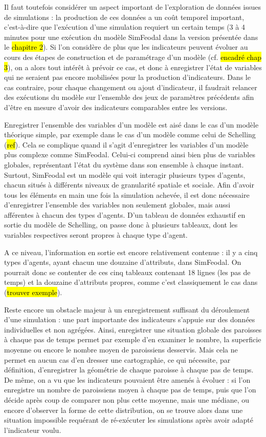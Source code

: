 	Il faut toutefois considérer un aspect important de l'exploration de données issues de simulations : la production de ces données a un coût temporel important, c'est-à-dire que l'exécution d'une simulation requiert un certain temps (3 à 4 minutes pour une exécution du modèle SimFeodal dans la version présentée dans le \hl{chapitre 2}).
	Si l'on considère de plus que les indicateurs peuvent évoluer au cours des étapes de construction et de paramétrage d'un modèle (cf. \hl{encadré chap 3}), on a alors tout intérêt à prévoir ce cas, et donc à enregistrer l'état de variables qui ne seraient pas encore mobilisées pour la production d'indicateurs.
	Dans le cas contraire, pour chaque changement ou ajout d'indicateur, il faudrait relancer des exécutions du modèle sur l'ensemble des jeux de paramètres précédents afin d'être en mesure d'avoir des indicateurs comparables entre les versions.

	Enregistrer l'ensemble des variables d'un modèle est aisé dans le cas d'un modèle théorique simple, par exemple dans le cas d'un modèle comme celui de Schelling (\hl{ref}). Cela se complique quand il s'agit d'enregistrer les variables d'un modèle plus complexe comme SimFeodal.
	Celui-ci comprend ainsi bien plus de variables globales, représentant l'état du système dans son ensemble à chaque instant.
	Surtout, SimFeodal est un modèle qui voit interagir plusieurs types d'agents, chacun situés à différents niveaux de granularité spatiale et sociale.
	Afin d'avoir tous les éléments en main une fois la simulation achevée, il est donc nécessaire d'enregistrer l'ensemble des variables non seulement globales, mais aussi afférentes à chacun des types d'agents.
	D'un tableau de données exhaustif en sortie du modèle de Schelling, on passe donc à plusieurs tableaux, dont les variables respectives seront propres à chaque type d'agent.

	A ce niveau, l'information en sortie est encore relativement contenue : il y a cinq types d'agents, ayant chacun une douzaine d'attributs, dans SimFeodal. On pourrait donc se contenter de ces cinq tableaux contenant 18 lignes (les pas de temps) et la douzaine d'attributs propres, comme c'est classiquement le cas dans (\hl{trouver exemple}).

	Reste encore un obstacle majeur à un enregistrement suffisant du déroulement d'une simulation : une part importante des indicateurs s'appuie sur des données individuelles et non agrégées.
	Ainsi, enregistrer une situation globale des paroisses à chaque pas de temps permet par exemple d'en examiner le nombre, la superficie moyenne ou encore le nombre moyen de paroissiens desservis.
	Mais cela ne permet en aucun cas d'en dresser une cartographie, ce qui nécessite, par définition, d'enregistrer la géométrie de chaque paroisse à chaque pas de temps.
	De même, on a vu que les indicateurs pouvaient être amenés à évoluer : si l'on enregistre un nombre de paroissiens moyen à chaque pas de temps, puis que l'on décide après coup de comparer non plus cette moyenne, mais une médiane, ou encore d'observer la forme de cette distribution, on se trouve alors dans une situation impossible requérant de ré-exécuter les simulations après avoir adapté l'indicateur voulu.

